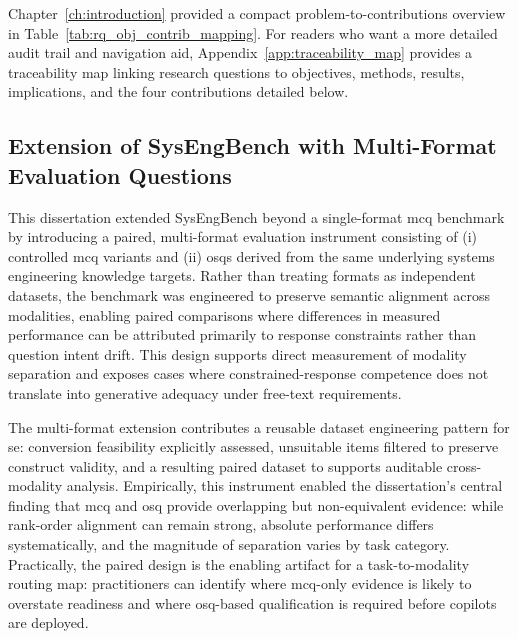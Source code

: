 Chapter~\ref{ch:introduction} provided a compact problem-to-contributions overview in Table~\ref{tab:rq_obj_contrib_mapping}. For readers who want a more detailed audit trail and navigation aid, Appendix~\ref{app:traceability_map} provides a traceability map linking research questions to objectives, methods, results, implications, and the four contributions detailed below.

\subsection{Extension of SysEngBench with Multi-Format Evaluation Questions}\label{subsec:ch6_contrib1}

This dissertation extended SysEngBench beyond a single-format \ac{mcq} benchmark by introducing a paired, multi-format evaluation instrument consisting of (i) controlled \ac{mcq} variants and (ii) \acp{osq} derived from the same underlying systems engineering knowledge targets. Rather than treating formats as independent datasets, the benchmark was engineered to preserve semantic alignment across modalities, enabling paired comparisons where differences in measured performance can be attributed primarily to response constraints rather than question intent drift. This design supports direct measurement of modality separation and exposes cases where constrained-response competence does not translate into generative adequacy under free-text requirements.

The multi-format extension contributes a reusable dataset engineering pattern for \ac{se}: conversion feasibility explicitly assessed, unsuitable items filtered to preserve construct validity, and a resulting paired dataset to supports auditable cross-modality analysis. Empirically, this instrument enabled the dissertation’s central finding that \ac{mcq} and \ac{osq} provide overlapping but non-equivalent evidence: while rank-order alignment can remain strong, absolute performance differs systematically, and the magnitude of separation varies by task category. Practically, the paired design is the enabling artifact for a task-to-modality routing map: practitioners can identify where \ac{mcq}-only evidence is likely to overstate readiness and where \ac{osq}-based qualification is required before copilots are deployed.



